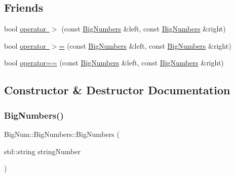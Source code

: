 \subsection*{Friends}
\begin{DoxyCompactItemize}
\item 
bool \mbox{\hyperlink{class_big_num_1_1_big_numbers_a433564007a70fb306c9937553e387a14}{operator $>$}} (const \mbox{\hyperlink{class_big_num_1_1_big_numbers}{Big\+Numbers}} \&left, const \mbox{\hyperlink{class_big_num_1_1_big_numbers}{Big\+Numbers}} \&right)
\item 
bool \mbox{\hyperlink{class_big_num_1_1_big_numbers_a078ae5f0c22d51ee735a24cc23aa2d3f}{operator $>$=}} (const \mbox{\hyperlink{class_big_num_1_1_big_numbers}{Big\+Numbers}} \&left, const \mbox{\hyperlink{class_big_num_1_1_big_numbers}{Big\+Numbers}} \&right)
\item 
bool \mbox{\hyperlink{class_big_num_1_1_big_numbers_adf1a700502274a7dc3c4d1d69f9f8738}{operator==}} (const \mbox{\hyperlink{class_big_num_1_1_big_numbers}{Big\+Numbers}} \&left, const \mbox{\hyperlink{class_big_num_1_1_big_numbers}{Big\+Numbers}} \&right)
\end{DoxyCompactItemize}


\subsection{Constructor \& Destructor Documentation}
\mbox{\label{class_big_num_1_1_big_numbers_a93b64afc4bf7066a411fe5dae6b2d5bc}} 
\subsubsection{\texorpdfstring{BigNumbers()}{BigNumbers()}\hspace{0.1cm}{\footnotesize\ttfamily [1/2]}}
{\footnotesize\ttfamily Big\+Num\+::\+Big\+Numbers\+::\+Big\+Numbers (\begin{DoxyParamCaption}\item[{std\+::string}]{string\+Number }\end{DoxyParamCaption})}

\mbox{\label{class_big_num_1_1_big_numbers_a0c13ca87447b955a385ab91c8e7f5485}} 
